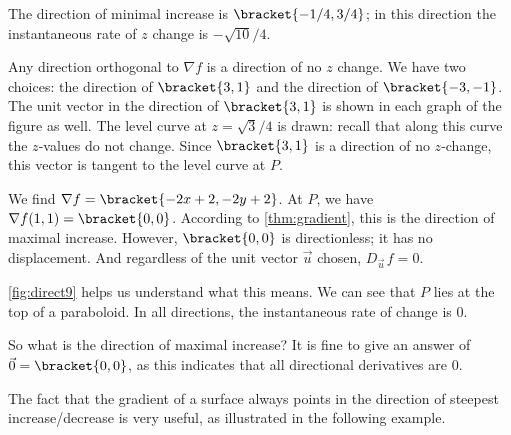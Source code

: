 {%

The direction of minimal increase is $\bracket{-1/4,3/4}$; in this direction the instantaneous rate of $z$ change is $-\sqrt{10}/4%
$.

Any direction orthogonal to $\nabla f$ is a direction of no $z$ change. We have two choices: the direction of $\bracket{3,1}$ and the direction of $\bracket{-3,-1}$. The unit vector in the direction of $\bracket{3,1}$ is shown in each graph of the figure as well. The level curve at $z=\sqrt{3}/4$ is drawn: recall that along this curve the $z$-values do not change. Since $\bracket{3,1}$ is a direction of no $z$-change, this vector is tangent to the level curve at $P$.}

{We find $\nabla f =\bracket{-2x+2, -2y+2}$. At $P$, we have $\nabla f(1,1) =\bracket{0,0}$. 
According to \autoref{thm:gradient}, this is the direction of maximal increase. However, $\bracket{0,0}$ is directionless; it has no displacement. And regardless of the unit vector $\vec u$ chosen, $D_{\vec u\,}f = 0$.

\autoref{fig:direct9} helps us understand what this means. We can see that $P$ lies at the top of a paraboloid. In all directions, the instantaneous rate of change is 0. 

So what is the direction of maximal increase? It is fine to give an answer of $\vec 0 =\bracket{0,0}$, as this indicates that all directional derivatives are 0.
}

The fact that the gradient of a surface always points in the direction of steepest increase/decrease is very useful, as illustrated in the following example.\\

